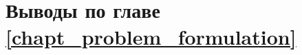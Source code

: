 ﻿\section{Выводы по главе \ref{chapt_problem_formulation}} \label{sect_conclusion_problem_statement}

